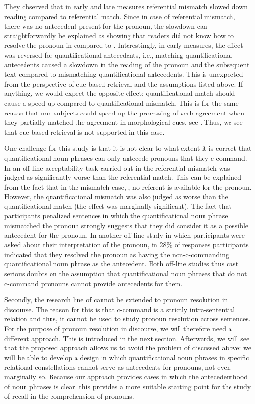 \documentclass[11pt]{article} %
\begin{document}
They observed that in early and late measures referential mismatch slowed down reading compared to referential match. Since in case of referential mismatch, there was no antecedent present for the pronoun, the slowdown can straightforwardly be explained as showing that readers did not know how to resolve the pronoun in \Last[b] compared to \Last[a]. Interestingly, in early measures, the effect was reversed for quantificational antecedents, i.e., matching quantificational antecedents caused a slowdown in the reading of the pronoun and the subsequent text compared to mismatching quantificational antecedents. This is unexpected from the perspective of cue-based retrieval and the assumptions listed above. If anything, we would expect the opposite effect: quantificational match should cause a speed-up compared to quantificational mismatch. This is for the same reason that non-subjects could speed up the processing of verb agreement when they partially matched the agreement in morphological cues, see \LLast[a]. Thus, we see that cue-based retrieval is not supported in this case.

One challenge for this study is that it is not clear to what extent it is correct that quantificational noun phrases can only antecede pronouns that they c-command. In an off-line acceptability task carried out in \cite{kush+15} the referential mismatch was judged as significantly worse than the referential match. This can be explained from the fact that in the mismatch case, \Last[b], no referent is available for the pronoun. However, the quantificational mismatch was also judged as worse than the quantificational match (the effect was marginally significant). The fact that participants penalized sentences in which the quantificational noun phrase mismatched the pronoun strongly suggests that they did consider it as a possible antecedent for the pronoun. In another off-line study in which participants were asked about their interpretation of the pronoun, in 28\% of responses participants indicated that they resolved the pronoun as having the non-c-commanding quantificational noun phrase as the antecedent. Both off-line studies thus cast serious doubts on the assumption that quantificational noun phrases that do not c-command pronouns cannot provide antecedents for them.

Secondly, the research line of \cite{kush+15} cannot be extended to pronoun resolution in discourse. The reason for this is that c-command is a strictly intra-sentential relation and thus, it cannot be used to study pronoun resolution across sentences. For the purpose of pronoun resolution in discourse, we will therefore need a different approach. This is introduced in the next section. Afterwards, we will see that the proposed approach allows us to avoid the problem of \cite{kush+15} discussed above: we will be able to develop a design in which quantificational noun phrases in specific relational constellations cannot serve as antecedents for pronouns, not even marginally so. Because our approach provides cases in which the antecedenthood of noun phrases is clear, this provides a more suitable starting point for the study of recall in the comprehension of pronouns.
\end{document}
